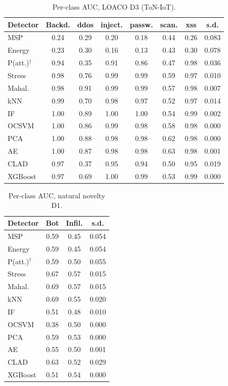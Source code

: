 \begin{table}[!t]
\centering
\scriptsize
\setlength{\tabcolsep}{2.6pt}
\caption{Per-class AUC, LOACO D3 (ToN-IoT).}
\label{tab:a_l3}
\begin{tabular}{lccccccc}
\toprule
Detector & Backd. & ddos & inject. & passw. & scan. & xss & s.d.\\
\midrule
MSP & 0.24 & 0.29 & 0.20 & 0.18 & 0.44 & 0.26 & 0.083\\
Energy & 0.23 & 0.30 & 0.16 & 0.13 & 0.43 & 0.30 & 0.078\\
P(att.)$^\dagger$ & 0.94 & 0.35 & 0.91 & 0.86 & 0.47 & 0.98 & 0.036\\
\midrule
Stress & 0.98 & 0.76 & 0.99 & 0.99 & 0.59 & 0.97 & 0.010\\
Mahal. & 0.98 & 0.91 & 0.99 & 0.99 & 0.57 & 0.98 & 0.007\\
kNN & 0.99 & 0.70 & 0.98 & 0.97 & 0.52 & 0.97 & 0.014\\
\midrule
IF & 1.00 & 0.89 & 1.00 & 1.00 & 0.54 & 0.99 & 0.002\\
OCSVM & 1.00 & 0.86 & 0.99 & 0.98 & 0.58 & 0.98 & 0.000\\
PCA & 1.00 & 0.88 & 0.98 & 0.98 & 0.62 & 0.98 & 0.000\\
AE & 1.00 & 0.87 & 0.98 & 0.98 & 0.63 & 0.98 & 0.001\\
\midrule
CLAD & 0.97 & 0.37 & 0.95 & 0.94 & 0.50 & 0.95 & 0.019\\
\midrule
XGBoost & 0.97 & 0.69 & 1.00 & 0.99 & 0.53 & 0.99 & 0.000\\
\bottomrule
\end{tabular}
\end{table}

\begin{table}[!t]
\centering
\scriptsize
\setlength{\tabcolsep}{2.6pt}
\caption{Per-class AUC, natural novelty D1.}
\label{tab:a_n1}
\begin{tabular}{lccc}
\toprule
Detector & Bot & Infil. & s.d.\\
\midrule
MSP & 0.59 & 0.45 & 0.054\\
Energy & 0.59 & 0.45 & 0.054\\
P(att.)$^\dagger$ & 0.59 & 0.50 & 0.055\\
\midrule
Stress & 0.67 & 0.57 & 0.015\\
Mahal. & 0.69 & 0.57 & 0.015\\
kNN & 0.69 & 0.55 & 0.020\\
\midrule
IF & 0.51 & 0.48 & 0.010\\
OCSVM & 0.38 & 0.50 & 0.000\\
PCA & 0.59 & 0.53 & 0.000\\
AE & 0.55 & 0.50 & 0.001\\
\midrule
CLAD & 0.63 & 0.52 & 0.029\\
\midrule
XGBoost & 0.51 & 0.54 & 0.000\\
\bottomrule
\end{tabular}
\end{table}

